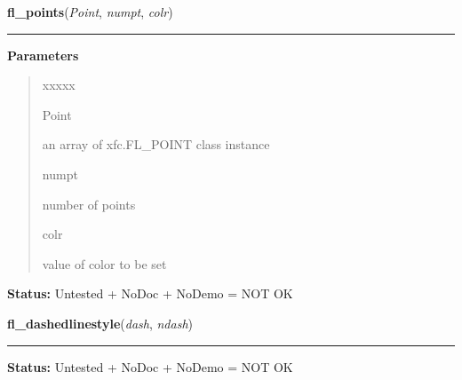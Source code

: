 \hspace{.8\funcindent}\begin{boxedminipage}{\funcwidth}

    \raggedright \textbf{fl\_points}(\textit{Point}, \textit{numpt}, \textit{colr})

    \vspace{-1.5ex}

    \rule{\textwidth}{0.5\fboxrule}
\setlength{\parskip}{2ex}
\setlength{\parskip}{1ex}
      \textbf{Parameters}
      \vspace{-1ex}

      \begin{quote}
        \begin{Ventry}{xxxxx}

          \item[Point]

          an array of xfc.FL\_POINT class instance

          \item[numpt]

          number of points

          \item[colr]

          value of color to be set

        \end{Ventry}

      \end{quote}

\textbf{Status:} Untested + NoDoc + NoDemo = NOT OK



    \end{boxedminipage}

    \label{xformslib:library:fl_dashedlinestyle}

    \vspace{0.5ex}

\hspace{.8\funcindent}\begin{boxedminipage}{\funcwidth}

    \raggedright \textbf{fl\_dashedlinestyle}(\textit{dash}, \textit{ndash})

    \vspace{-1.5ex}

    \rule{\textwidth}{0.5\fboxrule}
\setlength{\parskip}{2ex}
\setlength{\parskip}{1ex}
\textbf{Status:} Untested + NoDoc + NoDemo = NOT OK



    \end{boxedminipage}

